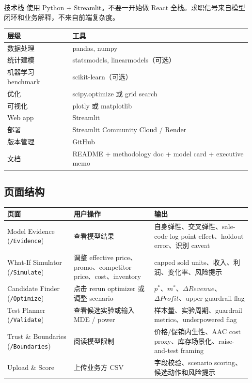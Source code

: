 \documentclass[UTF8,11pt,a4paper,fontset=none]{ctexart}
\begin{document}
\begin{decisionbox}{技术栈}
使用 Python + Streamlit。不要一开始做 React 全栈。求职信号来自模型闭环和业务解释，不来自前端复杂度。
\end{decisionbox}

\begin{tabularx}{\textwidth}{L{3.2cm}Y}
\toprule
层级 & 工具 \\
\midrule
数据处理 & pandas, numpy \\
统计建模 & statsmodels, linearmodels（可选） \\
机器学习 benchmark & scikit-learn（可选） \\
优化 & scipy.optimize 或 grid search \\
可视化 & plotly 或 matplotlib \\
Web app & Streamlit \\
部署 & Streamlit Community Cloud / Render \\
版本管理 & GitHub \\
文档 & README + methodology doc + model card + executive memo \\
\bottomrule
\end{tabularx}

\subsection{页面结构}

\begin{center}
\small
\begin{tabularx}{\textwidth}{L{3.4cm}L{4.3cm}Y}
\toprule
页面 & 用户操作 & 输出 \\
\midrule
Model Evidence (\texttt{/Evidence}) & 查看模型结果 & 自身弹性、交叉弹性、sale-code log-point effect、holdout error、识别 caveat \\
What-If Simulator (\texttt{/Simulate}) & 调整 effective price、promo、competitor price、cost、inventory & capped sold units、收入、利润、变化率、风险提示 \\
Candidate Finder (\texttt{/Optimize}) & 点击 rerun optimizer 或调整 scenario & $p^*$、$m^*$、$\Delta Revenue$、$\Delta Profit$、upper-guardrail flag \\
Test Planner (\texttt{/Validate}) & 查看候选实验或输入 MDE / power & 样本量、实验周期、guardrail metrics、underpowered flag \\
Trust \& Boundaries (\texttt{/Boundaries}) & 阅读模型限制 & 价格/促销内生性、AAC cost proxy、库存场景化、raise-and-test framing \\
Upload \& Score & 上传业务方 CSV & 字段校验、scenario scoring、候选动作和风险提示 \\
\bottomrule
\end{tabularx}
\end{center}
\end{document}
